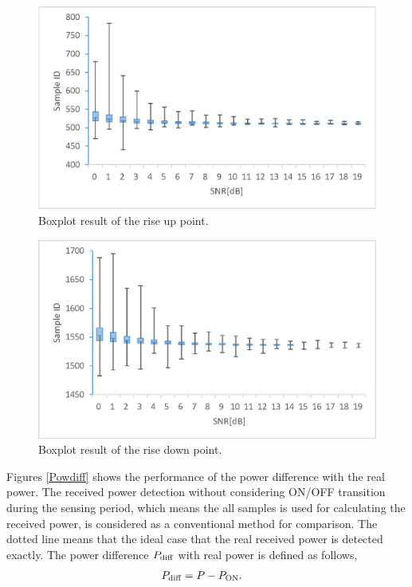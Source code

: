\newpage

\begin{figure}[t]
\centering
\includegraphics[width=120mm]{transition_up.eps}
\caption{Boxplot result of the rise up point.}
\label{transition_up}
\end{figure}
\begin{figure}[t]
\centering
\includegraphics[width=120mm]{transition_down.eps}
\caption{Boxplot result of the rise down point.}
\label{transition_down}
\end{figure}

Figures \ref{Powdiff} shows the performance of the power difference with the real power. 
The received power detection without considering ON/OFF transition during the sensing period, which means the all samples is used for calculating the received power, is considered as a conventional method for comparison. The dotted line means that the ideal case that the real received power is detected exactly. The power difference $P_{\rm diff}$ with real power is defined as follows,
\begin{eqnarray}
P_{{\rm diff}} &= P-P_{{\rm ON}}.
\label{diff}
\end{eqnarray}

